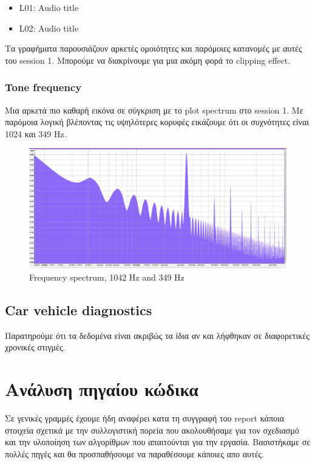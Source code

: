 \documentclass[hidelinks, 12pt, a4paper]{article}
\begin{document}
\begin{itemize}
    \item L01: Audio title
    \item L02: Audio title
\end{itemize}

Τα γραφήματα παρουσιάζουν αρκετές ομοιότητες και παρόμοιες κατανομές με αυτές του session 1. Μπορούμε να διακρίνουμε για μια ακόμη φορά το clipping effect.


\subsubsection{Tone frequency}

Μια αρκετά πιο καθαρή εικόνα σε σύγκριση με το plot spectrum στο session 1. Με παρόμοια λογική βλέποντας τις υψηλότερες κορυφές εικάζουμε ότι οι συχνότητες είναι 1024 και 349 Hz.

\begin{figure}[h!]
\centering
	\includegraphics[height=.3\textheight, width=\textwidth]{assets/session2/spectrum.png}
    \caption{Frequency spectrum, 1042 Hz and 349 Hz}
\end{figure}


\subsection{Car vehicle diagnostics}

Παρατηρούμε ότι τα δεδομένα είναι ακριβώς τα ίδια αν και λήφθηκαν σε διαφορετικές χρονικές στιγμές.

\section{Ανάλυση πηγαίου κώδικα}

Σε γενικές γραμμές έχουμε ήδη αναφέρει κατα τη συγγραφή του report κάποια στοιχεία σχετικά με την συλλογιστική πορεία που ακολουθήσαμε για τον σχεδιασμό και την υλοποίηση των αλγορίθμων που απαιτούνται για την εργασία. Βασιστήκαμε σε πολλές πηγές και θα προσπαθήσουμε να παραθέσουμε κάποιες απο αυτές.
\end{document}
